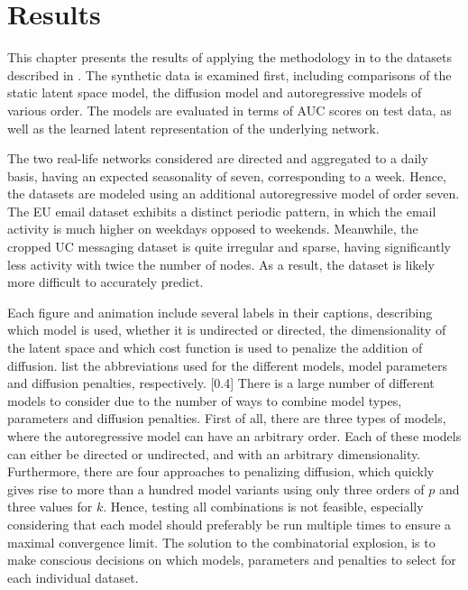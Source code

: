\chapter{Results}\label{ch:Results}

This chapter presents the results of applying the methodology in  to the datasets described in . The synthetic data is examined first, including comparisons of the static latent space model, the diffusion model and autoregressive models of various order. The models are evaluated in terms of AUC scores on test data, as well as the learned latent representation of the underlying network. 

The two real-life networks considered are directed and aggregated to a daily basis, having an expected seasonality of seven, corresponding to a week. Hence, the datasets are modeled using an additional autoregressive model of order seven. The EU email dataset exhibits a distinct periodic pattern, in which the email activity is much higher on weekdays opposed to weekends. Meanwhile, the cropped UC messaging dataset is quite irregular and sparse, having significantly less activity with twice the number of nodes. As a result, the dataset is likely more difficult to accurately predict.

Each figure and animation include several labels in their captions, describing which model is used, whether it is undirected or directed, the dimensionality of the latent space and which cost function is used to penalize the addition of diffusion. 
 list the abbreviations used for the different models, model parameters and diffusion penalties, respectively.
[0.4\textwidth]
There is a large number of different models to consider due to the number of ways to combine model types, parameters and diffusion penalties. First of all, there are three types of models, where the autoregressive model can have an arbitrary order. Each of these models can either be directed or undirected, and with an arbitrary dimensionality.
Furthermore, there are four approaches to penalizing diffusion, which quickly gives rise to more than a hundred model variants using only three orders of $p$ and three values for $k$. Hence, testing all combinations is not feasible, especially considering that each model should preferably be run multiple times to ensure a maximal convergence limit. The solution to the combinatorial explosion, is to make conscious decisions on which models, parameters and penalties to select for each individual dataset.



